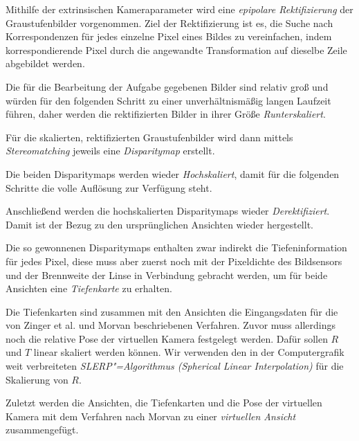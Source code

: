 Mithilfe der extrinsischen Kameraparameter wird eine \textit{epipolare Rektifizierung} der Graustufenbilder vorgenommen. Ziel der Rektifizierung ist es, die Suche nach Korrespondenzen für jedes einzelne Pixel eines Bildes zu vereinfachen, indem korrespondierende Pixel durch die angewandte Transformation auf dieselbe Zeile abgebildet werden.

Die für die Bearbeitung der Aufgabe gegebenen Bilder sind relativ groß und würden für den folgenden Schritt zu einer unverhältnismäßig langen Laufzeit führen, daher werden die rektifizierten Bilder in ihrer Größe \textit{Runterskaliert}.

Für die skalierten, rektifizierten Graustufenbilder wird dann mittels \textit{Stereomatching} jeweils eine \textit{Disparitymap} erstellt.

Die beiden Disparitymaps werden wieder \textit{Hochskaliert}, damit für die folgenden Schritte die volle Auflösung zur Verfügung steht.

Anschließend werden die hochskalierten Disparitymaps wieder \textit{Derektifiziert}. Damit ist der Bezug zu den ursprünglichen Ansichten wieder hergestellt.

Die so gewonnenen Disparitymaps enthalten zwar indirekt die Tiefeninformation für jedes Pixel, diese muss aber zuerst noch mit der Pixeldichte des Bildsensors und der Brennweite der Linse in Verbindung gebracht werden, um für beide Ansichten eine \textit{Tiefenkarte} zu erhalten.

Die Tiefenkarten sind zusammen mit den Ansichten die Eingangsdaten für die von Zinger et al. und Morvan beschriebenen Verfahren. Zuvor muss allerdings noch die relative Pose der virtuellen Kamera festgelegt werden. Dafür sollen $R$ und $T$ linear skaliert werden können. Wir verwenden den in der Computergrafik weit verbreiteten \textit{SLERP"=Algorithmus (Spherical Linear Interpolation)} für die Skalierung von $R$.

Zuletzt werden die Ansichten, die Tiefenkarten und die Pose der virtuellen Kamera mit dem Verfahren nach Morvan zu einer \textit{virtuellen Ansicht} zusammengefügt.